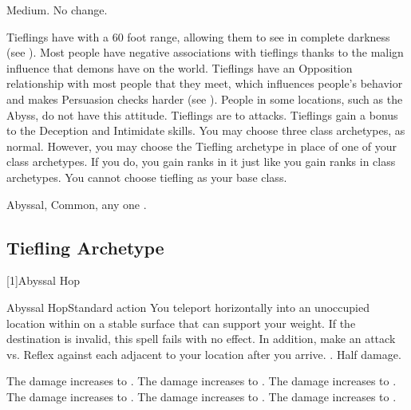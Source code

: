    Medium.
   No change.
  \begin{raggeditemize}
     Tieflings have  with a 60 foot range, allowing them to see in complete darkness (see ).
     Most people have negative associations with tieflings thanks to the malign influence that demons have on the world.
      Tieflings have an Opposition relationship with most people that they meet, which influences people's behavior and makes Persuasion checks harder (see ).
      People in some locations, such as the Abyss, do not have this attitude.
     Tieflings are \resistant to \atFire attacks.
     Tieflings gain a  bonus to the Deception and Intimidate skills.
     You may choose three class archetypes, as normal.
      However, you may choose the Tiefling archetype in place of one of your class archetypes.
      If you do, you gain ranks in it just like you gain ranks in class archetypes.
      You cannot choose tiefling as your base class.
  \end{raggeditemize}
   Abyssal, Common, any one .

  \subsection{Tiefling Archetype}
    [1]{Abyssal Hop}
    \begin{magicalactiveability}{Abyssal Hop}{Standard action}
        \abilitytags \atFire
        \rankline
        You teleport horizontally into an unoccupied location within \shortrange on a stable surface that can support your weight.
        If the destination is invalid, this spell fails with no effect.
        In addition, make an attack vs. Reflex against each  adjacent to your location after you arrive.
        \hit \damagerankzero.
        \miss Half damage.

        \rankline
         The damage increases to \damagerankone.
         The damage increases to \damageranktwo.
         The damage increases to \damagerankthree.
         The damage increases to \damagerankfour.
         The damage increases to \damagerankfive.
         The damage increases to \damageranksix.
      \end{magicalactiveability}

